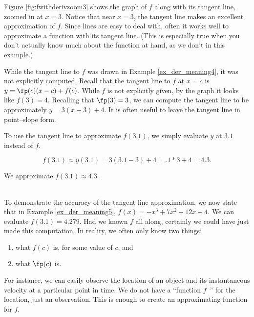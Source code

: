 {Figure \ref{fig:fwithderivzoom3} shows the graph of $f$ along with its tangent line, zoomed in at $x=3$. Notice that near $x=3$, the tangent line makes an excellent approximation of $f$. Since lines are easy to deal with, often it works well to approximate a function with its tangent line. (This is especially true when you don't actually know much about the function at hand, as we don't in this example.)


While the tangent line to $f$ was drawn in Example \ref{ex_der_meaning4}, it was not explicitly computed. Recall that the tangent line to $f$ at $x=c$ is $y = \fp(c)(x-c)+f(c)$. While $f$ is not explicitly given, by the graph it looks like $f(3) = 4$. Recalling that $\fp(3) = 3$, we can compute the tangent line to be approximately $y = 3(x-3)+4.$ It is often useful to leave the tangent line in point--slope form.

To use the tangent line to approximate $f(3.1)$, we simply evaluate $y$ at $3.1$ instead of $f$.

$$f(3.1) \approx y(3.1) = 3(3.1-3)+4 = .1*3+4 = 4.3.$$ 

We approximate $f(3.1) \approx 4.3.$
}\\

To demonstrate the accuracy of the tangent line approximation, we now state that in Example \ref{ex_der_meaning5}, $f(x) = -x^3+7x^2-12x+4$. We can evaluate $f(3.1) = 4.279$. Had we known $f$ all along, certainly we could have just made this computation. In reality, we often only know two things:
	\begin{enumerate}
	\item		what $f(c)$ is, for some value of $c$, and
	\item		what $\fp(c)$ is.
	\end{enumerate}
	
For instance, we can easily observe the location of an object and its instantaneous velocity at a particular point in time. We do not have a ``function $f$\ '' for the location, just an observation. This is enough to create an approximating function for $f$.

